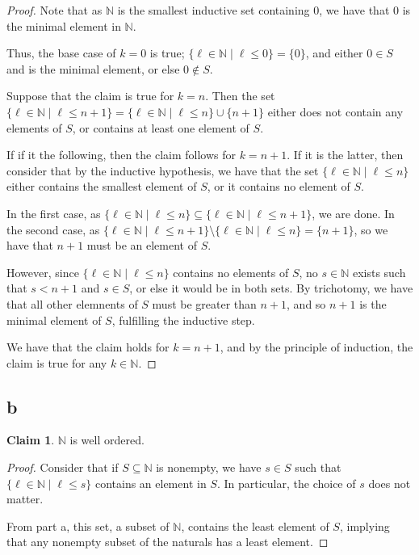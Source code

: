 \documentclass[12pt,letterpaper]{article}
\theoremstyle{definition}
\newtheorem*{claim}{Claim}
\newcommand{\N}{\mathbb{N}}
\begin{document}
\begin{proof}
    Note that as $\N$ is the smallest inductive set containing $0$, 
    we have that $0$ is the minimal element in $\N$.

    Thus, the base case of $k = 0$ is true; $\{\ell \in \N \mid \ell \leq 0\} = \{0\}$, and
    either $0 \in S$ and is the minimal element, or else $0 \notin S$.

    Suppose that the claim is true for $k = n$. 
    Then the set $\{\ell \in \N \mid \ell \leq n+1\} = \{\ell \in \N \mid \ell \leq n\} \cup \{n+1\}$ 
    either does not contain any elements of $S$, or contains at least one element of $S$.

    If if it the following, then the claim follows for $k = n+1$. 
    If it is the latter, then consider that by the inductive hypothesis, we have that
    the set $\{\ell \in \N \mid \ell \leq n\}$ either contains the smallest element of $S$,
    or it contains no element of $S$. 

    In the first case, as $\{\ell \in \N \mid \ell \leq n\} \subseteq \{\ell \in \N \mid \ell \leq n+1\}$,
    we are done. In the second case, as $\{\ell \in \N \mid \ell \leq n+1\} \setminus \{\ell \in \N \mid \ell \leq n\} = \{n+1\}$,
    so we have that $n+1$ must be an element of $S$.

    However, since $\{\ell \in \N \mid \ell \leq n\}$ contains no elements of $S$,
    no $s \in \N$ exists such that $s < n+1$ and $s \in S$, or else it would be in both sets.
    By trichotomy, we have that all other elemnents of $S$ must be greater than $n+1$,
    and so $n+1$ is the minimal element of $S$, fulfilling the inductive step.

    We have that the claim holds for $k = n+1$, and by the principle of induction, 
    the claim is true for any $k \in \N$.
\end{proof}

\subsection*{b}

\begin{claim}
    $\N$ is well ordered.
\end{claim}

\begin{proof}
    Consider that if $S \subseteq \N$ is nonempty,
    we have $s \in S$ such that $\{\ell \in \N \mid \ell \leq s\}$ contains an element in $S$.
    In particular, the choice of $s$ does not matter.

    From part a, this set, a subset of $\N$, contains the least element of $S$, implying that any nonempty
    subset of the naturals has a least element.
\end{proof}
\end{document}
